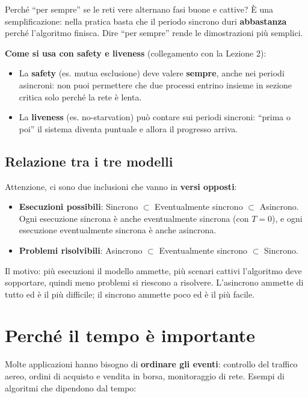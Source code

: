 Perché ``per sempre'' se le reti vere alternano fasi buone e cattive? È una semplificazione: nella pratica basta che il periodo sincrono duri \textbf{abbastanza} perché l'algoritmo finisca. Dire ``per sempre'' rende le dimostrazioni più semplici.

\textbf{Come si usa con safety e liveness} (collegamento con la Lezione 2):

\begin{itemize}
\tightlist
\item
  La \textbf{safety} (es. mutua esclusione) deve valere \textbf{sempre}, anche nei periodi asincroni: non puoi permettere che due processi entrino insieme in sezione critica solo perché la rete è lenta.
\item
  La \textbf{liveness} (es. no-starvation) può contare sui periodi sincroni: ``prima o poi'' il sistema diventa puntuale e allora il progresso arriva.
\end{itemize}

\subsection{Relazione tra i tre modelli}

Attenzione, ci sono due inclusioni che vanno in \textbf{versi opposti}:

\begin{itemize}
\tightlist
\item
  \textbf{Esecuzioni possibili}: Sincrono \(\subset\) Eventualmente sincrono \(\subset\) Asincrono. Ogni esecuzione sincrona è anche eventualmente sincrona (con \(T = 0\)), e ogni esecuzione eventualmente sincrona è anche asincrona.
\item
  \textbf{Problemi risolvibili}: Asincrono \(\subset\) Eventualmente sincrono \(\subset\) Sincrono.
\end{itemize}

Il motivo: più esecuzioni il modello ammette, più scenari cattivi l'algoritmo deve sopportare, quindi meno problemi si riescono a risolvere. L'asincrono ammette di tutto ed è il più difficile; il sincrono ammette poco ed è il più facile.

\section{Perché il tempo è importante}

Molte applicazioni hanno bisogno di \textbf{ordinare gli eventi}: controllo del traffico aereo, ordini di acquisto e vendita in borsa, monitoraggio di rete. Esempi di algoritmi che dipendono dal tempo:

